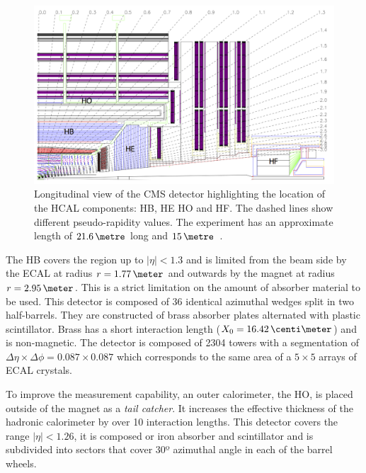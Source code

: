 \begin{figure}[!htb]
  \centering
  \includegraphics[width=1.0\textwidth]{Chapter02/CMS/Images/CMS_HCAL_Layout.png}
  \caption{Longitudinal view of the CMS detector highlighting the location of the \gls{HCAL} components: \gls{HB}, \gls{HE} \gls{HO} and \gls{HF}. The dashed lines show different pseudo-rapidity values. The experiment has an approximate length of  $21.6\,\metre$ long and $15\,\metre$~\cite{ARTICLE:TheCMSExperiment}.}
  \label{FIGURE:ExperimentalApparatus_CMS_HCAL_Layout}
\end{figure}

The \acrfull{HB} covers the region up to $|\eta|<1.3$ and is limited from the beam side by the \gls{ECAL} at radius $r=1.77\,\meter$ and outwards by the magnet at radius $r=2.95\,\meter$. This is a strict limitation on the amount of absorber material to be used. This detector is composed of 36 identical azimuthal wedges split in two half-barrels. They are constructed of brass absorber plates alternated with plastic scintillator. Brass has a short interaction length ($X_0=16.42\,\centi\meter$) and is non-magnetic. The detector is composed of 2304 towers with a segmentation of $\Delta\eta \times \Delta\phi = 0.087 \times 0.087$ which corresponds to the same area of a $5 \times 5$ arrays of \gls{ECAL} crystals.

To improve the measurement capability, an outer calorimeter, the \acrfull{HO}, is placed outside of the magnet as a \textit{tail catcher}. It increases the effective thickness of the hadronic calorimeter by over 10 interaction lengths. This detector covers the range $|\eta|<1.26$, it is composed or iron absorber and scintillator and is subdivided into sectors that cover 30º azimuthal angle in each of the barrel wheels. 

